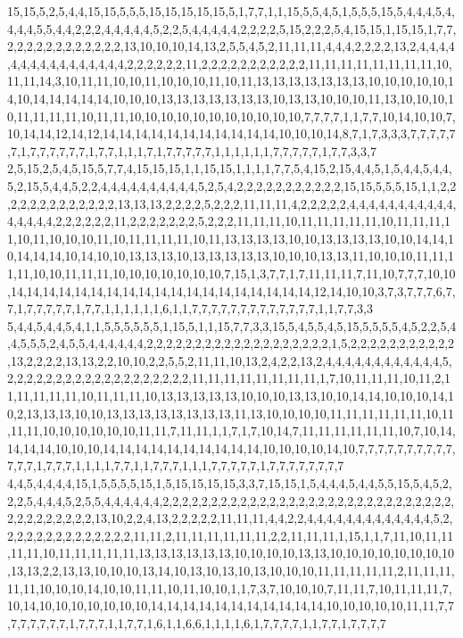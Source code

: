 15,15,5,2,5,4,4,15,15,5,5,5,15,15,15,15,15,5,1,7,7,1,1,15,5,5,4,5,1,5,5,5,15,5,4,4,4,5,4,4,4,4,5,5,4,4,2,2,2,4,4,4,4,4,5,2,2,5,4,4,4,4,4,2,2,2,2,5,15,2,2,2,5,4,15,15,1,15,15,1,7,7,2,2,2,2,2,2,2,2,2,2,2,2,13,10,10,10,14,13,2,5,5,4,5,2,11,11,11,4,4,4,2,2,2,2,13,2,4,4,4,4,4,4,4,4,4,4,4,4,4,4,4,4,2,2,2,2,2,2,11,2,2,2,2,2,2,2,2,2,2,2,11,11,11,11,11,11,11,11,10,11,11,14,3,10,11,11,10,10,11,10,10,10,11,10,11,13,13,13,13,13,13,13,10,10,10,10,10,14,10,14,14,14,14,14,10,10,10,13,13,13,13,13,13,13,10,13,13,10,10,10,11,13,10,10,10,10,11,11,11,11,10,11,11,10,10,10,10,10,10,10,10,10,10,10,7,7,7,7,1,1,7,7,10,14,10,10,7,10,14,14,12,14,12,14,14,14,14,14,14,14,14,14,14,14,10,10,10,14,8,7,1,7,3,3,3,7,7,7,7,7,7,1,7,7,7,7,7,7,1,7,7,1,1,1,7,1,7,7,7,7,7,1,1,1,1,1,1,7,7,7,7,7,1,7,7,3,3,7
2,5,15,2,5,4,5,15,5,7,7,4,15,15,15,1,1,15,15,1,1,1,1,7,7,5,4,15,2,15,4,4,5,1,5,4,4,5,4,4,5,2,15,5,4,4,5,2,2,4,4,4,4,4,4,4,4,4,4,5,2,5,4,2,2,2,2,2,2,2,2,2,2,2,15,15,5,5,5,15,1,1,2,2,2,2,2,2,2,2,2,2,2,2,2,13,13,13,2,2,2,2,5,2,2,2,11,11,11,4,2,2,2,2,2,4,4,4,4,4,4,4,4,4,4,4,4,4,4,4,4,2,2,2,2,2,2,11,2,2,2,2,2,2,2,5,2,2,2,11,11,11,10,11,11,11,11,11,10,11,11,11,11,10,11,10,10,10,11,10,11,11,11,11,10,11,13,13,13,13,10,10,13,13,13,13,10,10,14,14,10,14,14,14,10,14,10,10,13,13,13,10,13,13,13,13,13,10,10,10,13,13,11,10,10,10,11,11,11,11,10,10,11,11,11,10,10,10,10,10,10,10,7,15,1,3,7,7,1,7,11,11,11,7,11,10,7,7,7,10,10,14,14,14,14,14,14,14,14,14,14,14,14,14,14,14,14,14,14,14,12,14,10,10,3,7,3,7,7,7,6,7,7,1,7,7,7,7,7,1,7,7,1,1,1,1,1,1,6,1,1,7,7,7,7,7,7,7,7,7,7,7,7,7,1,1,7,7,3,3
5,4,4,5,4,4,5,4,1,1,5,5,5,5,5,5,1,15,5,1,1,15,7,7,3,3,15,5,4,5,5,4,5,15,5,5,5,5,4,5,2,2,5,4,4,5,5,5,2,4,5,5,4,4,4,4,4,4,2,2,2,2,2,2,2,2,2,2,2,2,2,2,2,2,2,2,2,1,5,2,2,2,2,2,2,2,2,2,2,2,13,2,2,2,2,13,13,2,2,10,10,2,2,5,5,2,11,11,10,13,2,4,2,2,13,2,4,4,4,4,4,4,4,4,4,4,4,4,5,2,2,2,2,2,2,2,2,2,2,2,2,2,2,2,2,2,2,2,11,11,11,11,11,11,11,11,1,7,10,11,11,11,10,11,2,11,11,11,11,11,10,11,11,11,10,13,13,13,13,13,10,10,10,13,13,10,10,14,14,10,10,10,14,10,2,13,13,13,10,10,13,13,13,13,13,13,13,13,11,13,10,10,10,10,11,11,11,11,11,11,10,11,11,11,10,10,10,10,10,10,11,11,7,11,11,1,1,7,1,7,10,14,7,11,11,11,11,11,11,10,7,10,14,14,14,14,10,10,10,14,14,14,14,14,14,14,14,14,14,10,10,10,10,14,10,7,7,7,7,7,7,7,7,7,7,7,7,7,1,7,7,7,1,1,1,1,7,7,1,1,7,7,7,1,1,1,7,7,7,7,7,1,7,7,7,7,7,7,7,7
4,4,5,4,4,4,4,15,1,5,5,5,5,15,1,5,15,15,15,15,3,3,7,15,15,1,5,4,4,4,5,4,4,5,5,15,5,4,5,2,2,2,5,4,4,4,5,2,5,5,4,4,4,4,4,4,2,2,2,2,2,2,2,2,2,2,2,2,2,2,2,2,2,2,2,2,2,2,2,2,2,2,2,2,2,2,2,2,2,2,2,2,2,2,2,13,10,2,2,4,13,2,2,2,2,2,11,11,11,4,4,2,2,4,4,4,4,4,4,4,4,4,4,4,4,4,5,2,2,2,2,2,2,2,2,2,2,2,2,2,2,11,11,2,11,11,11,11,11,11,2,2,11,11,11,1,15,1,1,7,11,10,11,11,11,11,10,11,11,11,11,11,13,13,13,13,13,13,10,10,10,10,13,13,10,10,10,10,10,10,10,10,13,13,2,2,13,13,10,10,10,13,14,10,13,10,13,10,13,10,10,10,11,11,11,11,11,2,11,11,11,11,11,10,10,10,14,10,10,11,11,10,11,10,10,1,1,7,3,7,10,10,10,7,11,11,7,10,11,11,11,7,10,14,10,10,10,10,10,10,10,14,14,14,14,14,14,14,14,14,14,14,10,10,10,10,10,11,11,7,7,7,7,7,7,7,7,1,7,7,7,1,1,7,7,1,6,1,1,6,6,1,1,1,1,6,1,7,7,7,7,1,1,7,7,1,7,7,7,7
